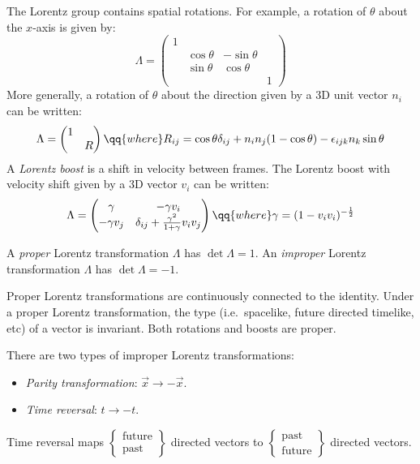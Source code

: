 \documentclass{jknotes} %
\begin{document}
The Lorentz group contains spatial rotations. For example, a rotation of \(\theta\) about the \(x\)-axis is given by:
\begin{equation}
    \Lambda = 
    \begin{pmatrix}
        1 \\
        & \cos\theta & -\sin\theta \\
        & \sin\theta & \cos\theta \\
        &&& 1
    \end{pmatrix}
\end{equation}
More generally, a rotation of \(\theta\) about the direction given by a 3D unit vector \(n_i\) can be written:
\begin{equation}
    \Lambda = 
    \begin{pmatrix}
        1 \\
        & R
    \end{pmatrix}
    \qq{where}
    R_{ij} = \cos\theta\delta_{ij} + n_in_j(1-\cos\theta) - \epsilon_{ijk} n_k \sin \theta
\end{equation}
A \emph{Lorentz boost} is a shift in velocity between frames. The Lorentz boost with velocity shift given by a 3D vector \(v_i\) can be written:
\begin{equation}
    \Lambda = 
    \begin{pmatrix}
        \gamma & -\gamma v_i \\
        -\gamma v_j & \delta_{ij}+\frac{\gamma^2}{1+\gamma}v_iv_j
    \end{pmatrix}
    \qq{where}
    \gamma = (1-v_iv_i)^{-\frac{1}{2}}
\end{equation}

\begin{defn}
    A \emph{proper} Lorentz transformation \(\Lambda\) has \(\det\Lambda = 1\). An \emph{improper} Lorentz transformation \(\Lambda\) has \(\det\Lambda = -1\).
\end{defn}

Proper Lorentz transformations are continuously connected to the identity. Under a proper Lorentz transformation, the type (i.e.\ spacelike, future directed timelike, etc) of a vector is invariant. Both rotations and boosts are proper.

There are two types of improper Lorentz transformations:
\begin{itemize}
    \item \emph{Parity transformation}: \(\vec{x}\rightarrow-\vec{x}\).
    \item \emph{Time reversal}: \(t \rightarrow -t\).
\end{itemize}
Time reversal maps \(\left\{
\begin{matrix}
    \text{future} \\ \text{past}
\end{matrix}
\right\}\) directed vectors to \(\left\{
\begin{matrix}
    \text{past} \\ \text{future}
\end{matrix}
\right\}\) directed vectors.
\end{document}
